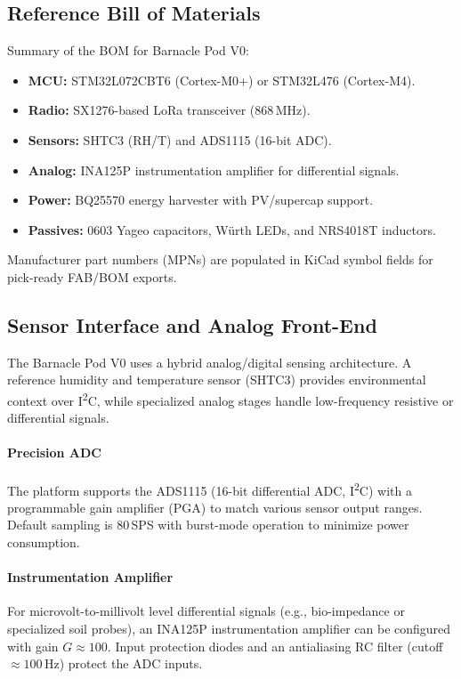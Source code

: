 \subsection{Reference Bill of Materials}\label{subsec:reference-bill-of-materials}
Summary of the \ac{BOM} for Barnacle Pod V0:
\begin{itemize}[nosep]
  \item \textbf{MCU:} STM32L072CBT6 (Cortex-M0+) or STM32L476 (Cortex-M4).
  \item \textbf{Radio:} SX1276-based \ac{LoRa} transceiver (868\,MHz).
  \item \textbf{Sensors:} SHTC3 (RH/T) and ADS1115 (16-bit ADC).
  \item \textbf{Analog:} INA125P instrumentation amplifier for differential signals.
  \item \textbf{Power:} BQ25570 energy harvester with PV/supercap support.
  \item \textbf{Passives:} 0603 Yageo capacitors, Würth LEDs, and NRS4018T inductors.
\end{itemize}
Manufacturer part numbers (MPNs) are populated in KiCad symbol fields for pick-ready FAB/\ac{BOM} exports.

\subsection{Sensor Interface and Analog Front-End}\label{subsec:sensor-interface-and-analog-front-end}
The Barnacle Pod V0 uses a hybrid analog/digital sensing architecture.
A reference humidity and temperature sensor (SHTC3) provides environmental context over I\textsuperscript{2}C, while specialized analog stages handle low-frequency resistive or differential signals.

\paragraph{Precision ADC}
The platform supports the ADS1115 (16-bit differential ADC, I\textsuperscript{2}C) with a programmable gain amplifier (PGA) to match various sensor output ranges.
Default sampling is 80\,SPS with burst-mode operation to minimize power consumption.

\paragraph{Instrumentation Amplifier}
For microvolt-to-millivolt level differential signals (e.g., bio-impedance or specialized soil probes), an INA125P instrumentation amplifier can be configured with gain $G \approx 100$.
Input protection diodes and an antialiasing RC filter (cutoff $\approx 100$\,Hz) protect the ADC inputs.

